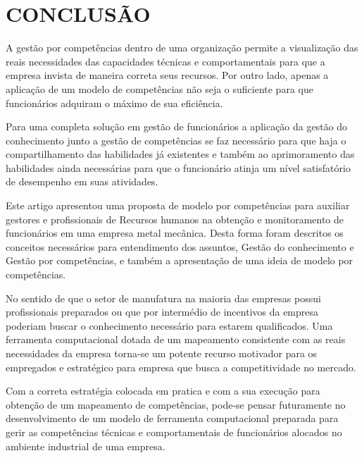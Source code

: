 \chapter{CONCLUSÃO} \label{sec:capitulos}

A gestão por competências dentro de uma organização permite a visualização das reais necessidades das capacidades técnicas e comportamentais para que a empresa invista de maneira correta seus recursos. Por outro lado, apenas a aplicação de um modelo de competências não seja o suficiente para que funcionários adquiram o máximo de sua eficiência.

Para uma completa solução em gestão de funcionários a aplicação da gestão do conhecimento junto a gestão de competências se faz necessário para que haja o compartilhamento das habilidades já existentes e também ao aprimoramento das habilidades ainda necessárias para que o funcionário atinja um nível satisfatório de desempenho em suas atividades.

Este artigo apresentou uma proposta de modelo por competências para auxiliar gestores e profissionais de Recursos humanos na obtenção e monitoramento de funcionários em uma empresa metal mecânica. Desta forma foram descritos os conceitos necessários para entendimento dos assuntos, Gestão do conhecimento e Gestão por competências, e também a apresentação de uma ideia de modelo por competências.

No sentido de que o setor de manufatura na maioria das empresas possui profissionais preparados ou que por intermédio de incentivos da empresa poderiam buscar o conhecimento necessário para estarem qualificados. Uma ferramenta computacional dotada de um mapeamento consistente com as reais necessidades da empresa torna-se um potente recurso motivador para os empregados e estratégico para empresa que busca a competitividade no mercado.

Com a correta estratégia colocada em pratica e com a sua execução para obtenção de um mapeamento de competências, pode-se pensar futuramente no desenvolvimento de um modelo de ferramenta computacional preparada para gerir as competências técnicas e comportamentais de funcionários alocados no ambiente industrial de uma empresa.
